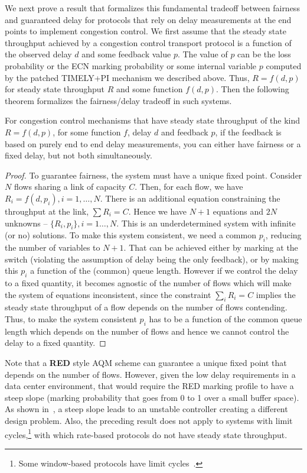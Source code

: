 We next prove a result that formalizes this fundamental tradeoff between fairness
and guaranteed delay for protocols that rely on delay measurements at the end
points to implement congestion control. We first assume that the
steady state throughput achieved by a congestion control transport
protocol is a function of the observed delay $d$ and some feedback
value $p$. The value of $p$ can be the loss probability or the ECN marking
probability or some internal variable $p$ computed by the patched
TIMELY+PI mechanism we described above. Thus,
$R = f(d,p)$ for steady state throughput $R$ and some function $f(d,p)$. Then the
following theorem formalizes the fairness/delay tradeoff in such systems.
\vspace{-0.5em}
\begin{thm}
\label{thm:fairness-delay}
For congestion control mechanisms that have steady state throughput of
the kind $R = f(d,p)$, for some function $f$, delay $d$ and
feedback $p$, if the feedback is based on purely end to end
delay measurements, you can either have fairness or a fixed delay, 
but not both simultaneously.
\end{thm}
\begin{proof}
To guarantee fairness, the system must have a
unique fixed point. 
Consider $N$ flows sharing a link of capacity $C$. 
Then, for each flow, we have 
$ R_i = f(d,p_i), i = 1,\ldots,N.$
There is an additional equation constraining the throughput at the
link, $\sum R_i = C$.
Hence we have $N+1$ equations and $2 N$ unknowns -- $\{R_i,p_i\},
 i=1\ldots,N$. This is an underdetermined system with infinite (or no)
solutions. To make this system consistent, we need a common $p_i$,
reducing the number of variables to $N+1$. That can be achieved
either by marking at the switch (violating the assumption of delay
being the only feedback), or by making this $p_i$ a function of
the (common) queue length. However if we control the delay to a fixed quantity,
it becomes agnostic of the number of flows which will make the system
of equations inconsistent, since the constraint $\sum_i R_i = C$
implies the steady state throughput of a flow depends on the number of
flows contending. Thus, to make the system consistent $p_i$ has to be
a function of the common queue length which depends on the number of flows 
and hence we cannot control the delay to a fixed quantity. 
\end{proof}
\vspace{-0.5em}
Note that a \textbf{RED} style AQM scheme can guarantee a unique fixed point
that depends on the number of flows. However, given the low delay
requirements in a data center environment, that would require the RED
marking profile to have a steep slope (marking probability that goes
from 0 to 1 over a small buffer space). As shown
in~\cite{misra:TAC2002}, a steep slope leads to an unstable
controller creating a different design problem. 
Also, the preceding result does not apply to systems with
limit cycles,\footnote{Some window-based protocols have limit cycles~\cite{dctcp-analysis}.} 
with which rate-based protocols do not have steady state throughput.

